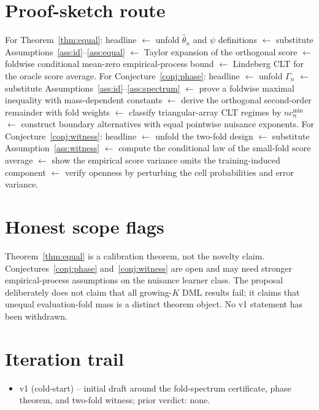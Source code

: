 \documentclass[11pt]{article}
\theoremstyle{definition}
\theoremstyle{plain}
\theoremstyle{remark}
\begin{document}
\section{Proof-sketch route}
For Theorem~\ref{thm:equal}: headline \(\leftarrow\) unfold \(\hat\theta_n\) and \(\psi\) definitions \(\leftarrow\) substitute Assumptions~\ref{ass:id}--\ref{ass:equal} \(\leftarrow\) Taylor expansion of the orthogonal score \(\leftarrow\) foldwise conditional mean-zero empirical-process bound \(\leftarrow\) Lindeberg CLT for the oracle score average. For Conjecture~\ref{conj:phase}: headline \(\leftarrow\) unfold \(\Gamma_n\) \(\leftarrow\) substitute Assumptions~\ref{ass:id}--\ref{ass:spectrum} \(\leftarrow\) prove a foldwise maximal inequality with mass-dependent constants \(\leftarrow\) derive the orthogonal second-order remainder with fold weights \(\leftarrow\) classify triangular-array CLT regimes by \(n c_n^{\min}\) \(\leftarrow\) construct boundary alternatives with equal pointwise nuisance exponents. For Conjecture~\ref{conj:witness}: headline \(\leftarrow\) unfold the two-fold design \(\leftarrow\) substitute Assumption~\ref{ass:witness} \(\leftarrow\) compute the conditional law of the small-fold score average \(\leftarrow\) show the empirical score variance omits the training-induced component \(\leftarrow\) verify openness by perturbing the cell probabilities and error variance.

\section{Honest scope flags}
Theorem~\ref{thm:equal} is a calibration theorem, not the novelty claim. Conjectures~\ref{conj:phase} and~\ref{conj:witness} are open and may need stronger empirical-process assumptions on the nuisance learner class. The proposal deliberately does not claim that all growing-\(K\) DML results fail; it claims that unequal evaluation-fold mass is a distinct theorem object. No v1 statement has been withdrawn.

\section{Iteration trail}
\begin{itemize}[leftmargin=*]
\item v1 (cold-start) -- initial draft around the fold-spectrum certificate, phase theorem, and two-fold witness; prior verdict: none.
\end{itemize}
\end{document}
